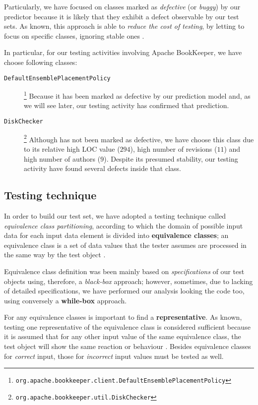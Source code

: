 \documentclass[sigconf]{acmart}
\begin{document}
Particularly, we have focused on classes marked as \textit{defective} (or \textit{buggy}) by our predictor because it is likely that they exhibit a defect observable by our test sets. As known, this approach is able to \textit{reduce the cost of testing}, by letting to focus on specific classes, ignoring stable ones \cite{Falessi}.

In particular, for our testing activities involving Apache BookKeeper\texttrademark, we have choose following classes:
\begin{description}
\item[\texttt{DefaultEnsemblePlacementPolicy}]\footnote{\texttt{org.apache.bookkeeper.client.DefaultEnsemblePlacementPolicy}} Because it has been marked as defective by our prediction model and, as we will see later, our testing activity has confirmed that prediction.
\item[\texttt{DiskChecker}]\footnote{\texttt{org.apache.bookkeeper.util.DiskChecker}} Although has not been marked as defective, we have choose this class due to its relative high LOC value ($294$), high number of revisions ($11$) and high number of authors ($9$). Despite its presumed stability, our testing activity have found several defects inside that class. 
\end{description}

\subsection{Testing technique}

In order to build our test set, we have adopted a testing technique called \textit{equivalence class partitioning}, according to which the domain of possible input data for each input data element is divided
into \textbf{equivalence classes}; an equivalence class is a set of data values that the tester assumes are processed in the same way by the test object \cite{FoundationSoftwareTesting}. 

Equivalence class definition was been mainly based on \textit{specifications} of our test objects using, therefore, a \textit{black-box} approach; however, sometimes, due to lacking of detailed specifications, we have performed our analysis looking the code too, using conversely a \textbf{while-box} approach. 

For any equivalence classes is important to find a \textbf{representative}. As known, testing one representative of the equivalence class is considered sufficient because it is assumed that for any other input value of the same equivalence class, the test object will show the same reaction or behaviour \cite{FoundationSoftwareTesting}. Besides equivalence classes for \textit{correct} input, those for \textit{incorrect} input values must be tested as well.
\end{document}
